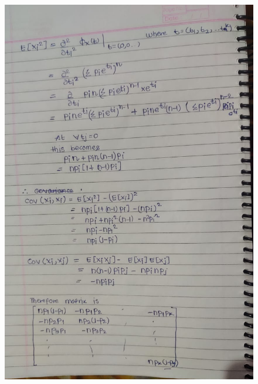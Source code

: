 \documentclass{article}
\theoremstyle{remark}
\begin{document}
\begin{figure}[h!]
    \includegraphics[width=\textwidth, height=\textheight, keepaspectratio]{7b.jpeg}\par
\end{figure}
\end{document}
